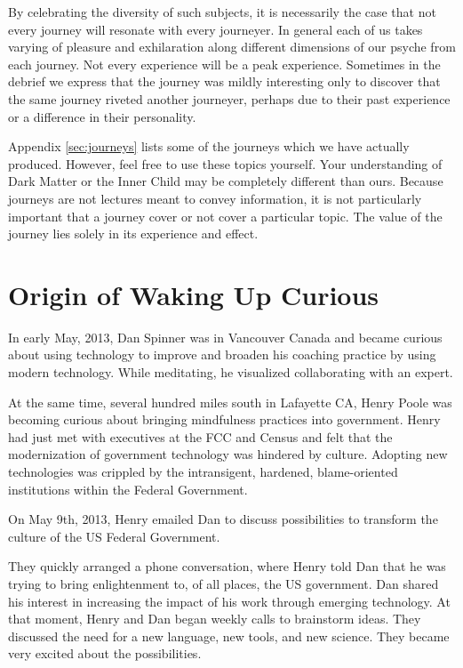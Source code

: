 \documentclass[12pt]{book}
\begin{document}
By celebrating the diversity of such subjects, it is necessarily
the case that not every journey will resonate with every journeyer.
In general each of us takes varying of pleasure and exhilaration
along different dimensions of our psyche from each journey.
Not every experience will be a peak experience. Sometimes in
the debrief we express that the journey was mildly interesting
only to discover that the same journey riveted another journeyer,
perhaps due to their past experience or a difference in their
personality.

Appendix \ref{sec:journeys} lists some of the journeys which we have actually
produced. However, feel free to use these topics yourself. Your
understanding of Dark Matter or the Inner Child may be completely
different than ours. Because journeys are not lectures meant
to convey information, it is not particularly important that
a journey cover or not cover a particular topic. The value
of the journey lies solely in its experience and effect.

\chapter{Origin of Waking Up Curious}

In early May, 2013, Dan Spinner was in Vancouver Canada and became
curious about using technology to improve and broaden his coaching
practice by using modern technology. While meditating, he visualized
collaborating with an expert.

At the same time, several hundred miles south in Lafayette CA, Henry
Poole was becoming curious about bringing mindfulness practices into
government. Henry had just met with executives at the FCC and Census
and felt that the modernization of government technology was hindered
by culture. Adopting new technologies was crippled by the
intransigent, hardened, blame-oriented institutions within the Federal
Government.

On May 9th, 2013, Henry emailed Dan to discuss possibilities to
transform the culture of the US Federal Government.

They quickly arranged a phone conversation, where Henry told Dan that
he was trying to bring enlightenment to, of all places, the US
government. Dan shared his interest in increasing the impact of his
work through emerging technology. At that moment, Henry and Dan began
weekly calls to brainstorm ideas. They discussed the need for a new
language, new tools, and new science. They became very excited about
the possibilities.
\end{document}
